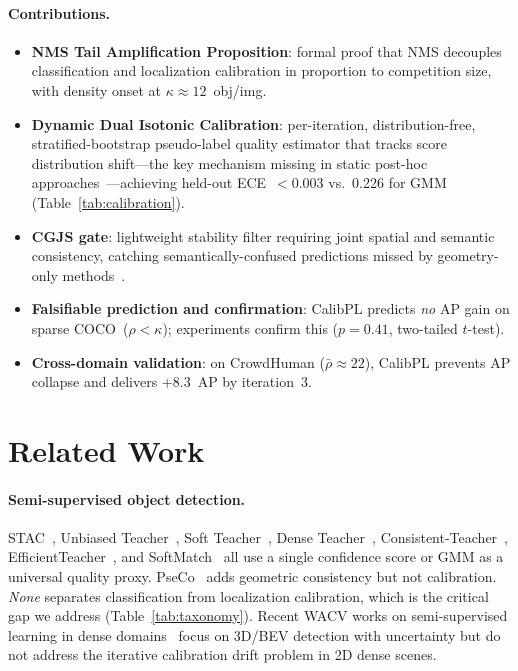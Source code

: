 \documentclass[10pt,twocolumn,letterpaper]{article}
\newcommand{\coco}{\textsc{COCO}\xspace}
\begin{document}
\paragraph{Contributions.}
\begin{itemize}[noitemsep,topsep=2pt,leftmargin=*]
  \item \textbf{NMS Tail Amplification Proposition}: formal proof that NMS
    decouples classification and localization calibration in proportion to
    competition size, with density onset at $\kappa{\approx}12$~obj/img.
  \item \textbf{Dynamic Dual Isotonic Calibration}: per-iteration,
    distribution-free, stratified-bootstrap pseudo-label quality estimator
    that tracks score distribution shift---the key mechanism missing in static
    post-hoc approaches~\cite{kuzucu2024calibration}---achieving
    held-out ECE~${<}0.003$ vs.\ 0.226 for GMM (Table~\ref{tab:calibration}).
  \item \textbf{CGJS gate}: lightweight stability filter requiring joint
    spatial and semantic consistency, catching semantically-confused
    predictions missed by geometry-only methods~\cite{pseco2022}.
  \item \textbf{Falsifiable prediction and confirmation}: CalibPL
    predicts \emph{no} AP gain on sparse \coco\ ($\rho{<}\kappa$);
    experiments confirm this ($p{=}0.41$, two-tailed $t$-test).
  \item \textbf{Cross-domain validation}: on CrowdHuman
    ($\bar{\rho}{\approx}22$), CalibPL prevents AP collapse and delivers
    +8.3~AP by iteration~3.
\end{itemize}

\section{Related Work}
\label{sec:related}

\paragraph{Semi-supervised object detection.}
STAC~\cite{stac2020}, Unbiased Teacher~\cite{unbiasedteacher2021},
Soft Teacher~\cite{softteacher2021}, Dense
Teacher~\cite{denseteacher2022}, Consistent-Teacher~\cite{consistentteacher2023},
EfficientTeacher~\cite{efficientteacher2023}, and
SoftMatch~\cite{softmatch2023} all use a single confidence score or GMM as a
universal quality proxy. PseCo~\cite{pseco2022} adds geometric consistency but
not calibration. \emph{None} separates classification from localization
calibration, which is the critical gap we address (Table~\ref{tab:taxonomy}).
Recent WACV works on semi-supervised learning in dense
domains~\cite{mvat2026,reflectiveteacher2025} focus on 3D/BEV detection with
uncertainty but do not address the iterative calibration drift problem in 2D
dense scenes.
\end{document}
